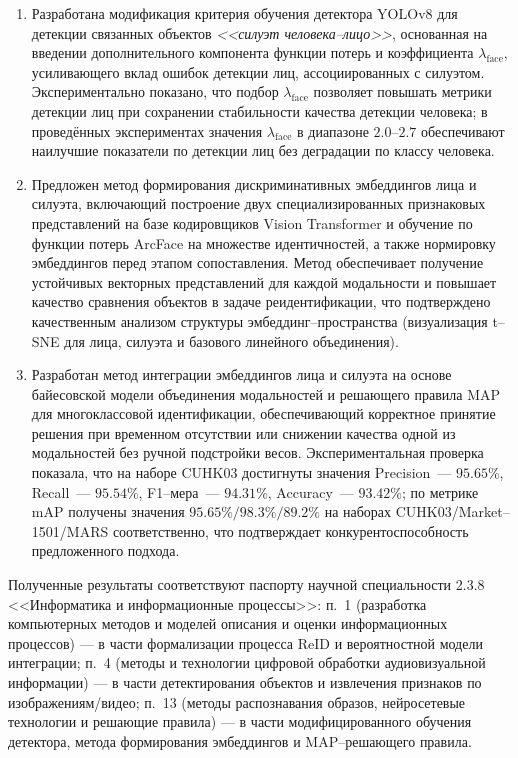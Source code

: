 \begin{enumerate}
    \item Разработана модификация критерия обучения детектора YOLOv8 для детекции
    связанных объектов \textit{<<силуэт человека--лицо>>}, основанная на введении
    дополнительного компонента функции потерь и коэффициента
    $\lambda_{\text{face}}$, усиливающего вклад ошибок детекции лиц,
    ассоциированных с силуэтом. Экспериментально показано, что подбор
    $\lambda_{\text{face}}$ позволяет повышать метрики детекции лиц при сохранении
    стабильности качества детекции человека; в проведённых экспериментах
    значения $\lambda_{\text{face}}$ в диапазоне $2.0$--$2.7$ обеспечивают наилучшие
    показатели по детекции лиц без деградации по классу человека.

    \item Предложен метод формирования дискриминативных эмбеддингов лица и силуэта,
    включающий построение двух специализированных признаковых представлений на базе
    кодировщиков Vision Transformer и обучение по функции потерь ArcFace на множестве
    идентичностей, а также нормировку эмбеддингов перед этапом сопоставления.
    Метод обеспечивает получение устойчивых векторных представлений для каждой
    модальности и повышает качество сравнения объектов в задаче реидентификации,
    что подтверждено качественным анализом структуры эмбеддинг--пространства
    (визуализация t--SNE для лица, силуэта и базового линейного объединения).

    \item Разработан метод интеграции эмбеддингов лица и силуэта на основе
    байесовской модели объединения модальностей и решающего правила MAP для
    многоклассовой идентификации, обеспечивающий корректное принятие решения при
    временном отсутствии или снижении качества одной из модальностей без ручной
    подстройки весов. Экспериментальная проверка показала, что на наборе CUHK03
    достигнуты значения Precision~--- $95.65\%$, Recall~--- $95.54\%$,
    F1--мера~--- $94.31\%$, Accuracy~--- $93.42\%$; по метрике mAP получены
    значения $95.65\%/98.3\%/89.2\%$ на наборах CUHK03/Market--1501/MARS
    соответственно, что подтверждает конкурентоспособность предложенного подхода.
\end{enumerate}

Полученные результаты соответствуют паспорту научной специальности 2.3.8
<<Информатика и информационные процессы>>: п.~1 (разработка компьютерных методов
и моделей описания и оценки информационных процессов) --- в части формализации
процесса ReID и вероятностной модели интеграции; п.~4 (методы и технологии
цифровой обработки аудиовизуальной информации) --- в части детектирования объектов
и извлечения признаков по изображениям/видео; п.~13 (методы распознавания образов,
нейросетевые технологии и решающие правила) --- в части модифицированного обучения
детектора, метода формирования эмбеддингов и MAP--решающего правила.

